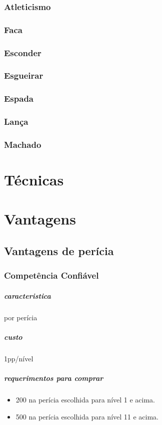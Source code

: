 \subsection{Atleticismo}
\subsection{Faca}
\subsection{Esconder}
\subsection{Esgueirar}
\subsection{Espada}
\subsection{Lança}
\subsection{Machado}
\chapter{Técnicas}
%
%
%
%
%
\chapter{Vantagens}
%
%
\section{Vantagens de perícia}
%
%
\subsection{Competência Confiável}
\paragraph{caracteristica} por perícia
\paragraph{custo} 1pp/nível
\paragraph{requerimentos para comprar}
\begin{itemize}
  \item 200 na perícia escolhida para nível 1 e acima.
  \item 500 na perícia escolhida para nível 11 e acima.
\end{itemize}
